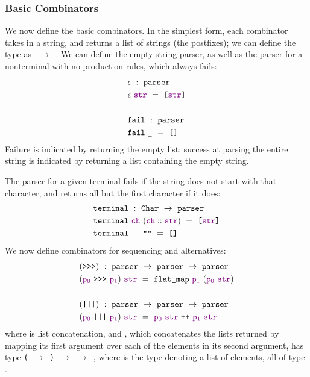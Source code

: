    \subsubsection{Basic Combinators}
      We now define the basic combinators.  In the simplest form, each combinator takes in a string, and returns a list of strings (the postfixes); we can define the type  as ~$\to$~.  We can define the empty-string parser, as well as the parser for a nonterminal with no production rules, which always fails:
\begin{align*}
&\epsilon~:~\texttt{parser}\\
&\epsilon~\textcolor{violet}{\texttt{str}}~=~\texttt{[}\textcolor{violet}{\texttt{str}}\texttt{]} \\ \\
&\texttt{fail}~:~\texttt{parser}\\
&\texttt{fail}~\texttt{\_}~=~\texttt{[]}
\end{align*}
      Failure is indicated by returning the empty list; success at parsing the entire string is indicated by returning a list containing the empty string.
      
      The parser for a given terminal fails if the string does not start with that character, and returns all but the first character if it does:
\begin{align*}
&\fname{terminal}~:~\indname{Char}~\to~\fname{parser}\\
&\fname{terminal}~\farg{ch}~(\cons{\farg{ch}}{\farg{str}})~=~\valuelist{\farg{str}} \\
&\fname{terminal}~\aswidthof{\termhole}{\farg{ch}}~\str{}~=~\nil
\end{align*}
      We now define combinators for sequencing and alternatives:
\newcommand{\sequencing}{\fname{>{}>{}>}}
\begin{align*}
&(\sequencing)~:~\fname{parser}~\to~\fname{parser}~\to~\fname{parser}\\
&(\farg{p\ensuremath{_0}}~\sequencing~\farg{p\ensuremath{_1}})~\farg{str}~=~\fname{flat\_map}~\farg{p\ensuremath{_1}}~(\farg{p\ensuremath{_0}}~\farg{str}) \\ \\
&(\fname{|||})~:~\fname{parser}~\to~\fname{parser}~\to~\fname{parser}\\
&(\farg{p\ensuremath{_0}}~\fname{|||}~\farg{p\ensuremath{_1}})~\farg{str}~=~\farg{p\ensuremath{_0}}~\farg{str}~\fname{++}~\farg{p\ensuremath{_1}}~\farg{str}
\end{align*}
      where \fname{++} is list concatenation, and , which concatenates the lists returned by mapping its first argument over each of the elements in its second argument, has type \texttt{( $\to$ ) $\to$  $\to$ }, where  is the type denoting a list of elements, all of type .
      

